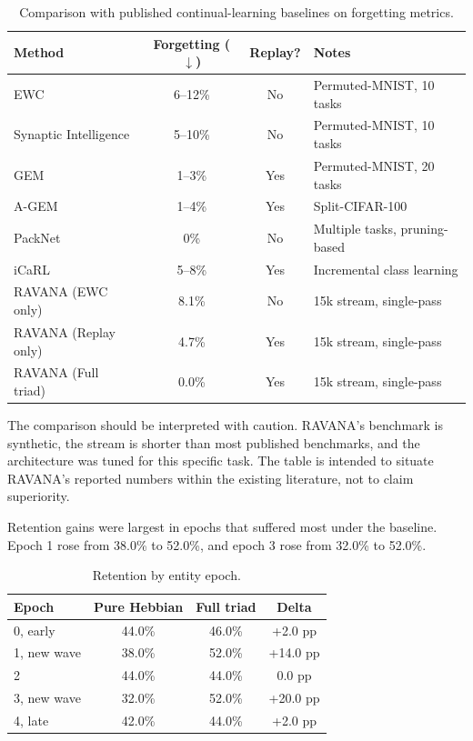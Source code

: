 \documentclass[11pt]{article}
\begin{document}
\begin{table}[h]
\centering
\caption{Comparison with published continual-learning baselines on forgetting metrics.}
\label{tab:published-baselines}
\begin{tabular}{lccp{5.2cm}}
\toprule
Method & Forgetting ($\downarrow$) & Replay? & Notes \\
\midrule
EWC \cite{kirkpatrick2017} & 6--12\% & No & Permuted-MNIST, 10 tasks \\
Synaptic Intelligence \cite{zenke2017} & 5--10\% & No & Permuted-MNIST, 10 tasks \\
GEM \cite{lopezpaz2017} & 1--3\% & Yes & Permuted-MNIST, 20 tasks \\
A-GEM \cite{chaudhry2019} & 1--4\% & Yes & Split-CIFAR-100 \\
PackNet \cite{mallya2018} & 0\% & No & Multiple tasks, pruning-based \\
iCaRL \cite{rebuffi2017} & 5--8\% & Yes & Incremental class learning \\
\midrule
RAVANA (EWC only) & 8.1\% & No & 15k stream, single-pass \\
RAVANA (Replay only) & 4.7\% & Yes & 15k stream, single-pass \\
RAVANA (Full triad) & 0.0\% & Yes & 15k stream, single-pass \\
\bottomrule
\end{tabular}
\end{table}

The comparison should be interpreted with caution. RAVANA's benchmark is synthetic, the stream is shorter than most published benchmarks, and the architecture was tuned for this specific task. The table is intended to situate RAVANA's reported numbers within the existing literature, not to claim superiority.

Retention gains were largest in epochs that suffered most under the baseline. Epoch 1 rose from 38.0\% to 52.0\%, and epoch 3 rose from 32.0\% to 52.0\%.

\begin{table}[h]
\centering
\caption{Retention by entity epoch.}
\begin{tabular}{lccc}
\toprule
Epoch & Pure Hebbian & Full triad & Delta \\
\midrule
0, early & 44.0\% & 46.0\% & +2.0 pp \\
1, new wave & 38.0\% & 52.0\% & +14.0 pp \\
2 & 44.0\% & 44.0\% & 0.0 pp \\
3, new wave & 32.0\% & 52.0\% & +20.0 pp \\
4, late & 42.0\% & 44.0\% & +2.0 pp \\
\bottomrule
\end{tabular}
\end{table}
\end{document}

